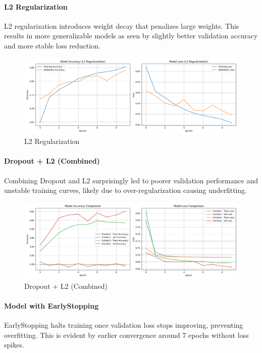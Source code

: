 \documentclass{article}
\begin{document}
\paragraph{L2 Regularization}
L2 regularization introduces weight decay that penalizes large weights. This results in more generalizable models as seen by slightly better validation accuracy and more stable loss reduction.

\begin{figure}[H]
\centering
\includegraphics[width=0.9\linewidth]{l2_accuracy_loss.png}
\caption{L2 Regularization}
\end{figure}

\paragraph{Dropout + L2 (Combined)}
Combining Dropout and L2 surprisingly led to poorer validation performance and unstable training curves, likely due to over-regularization causing underfitting.

\begin{figure}[H]
\centering
\includegraphics[width=0.9\linewidth]{combo_accuracy_loss.png}
\caption{Dropout + L2 (Combined)}
\end{figure}

\paragraph{Model with EarlyStopping}
EarlyStopping halts training once validation loss stops improving, preventing overfitting. This is evident by earlier convergence around 7 epochs without loss spikes.
\end{document}

